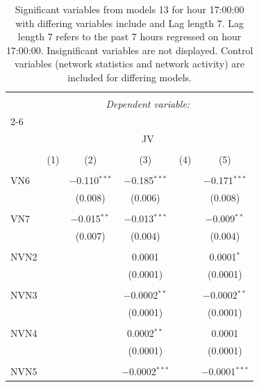 
\begin{table}[!htbp] \centering 
  \caption{Significant variables from models 13 for hour 17:00:00 with differing variables include 
                               and Lag length 7. Lag length 7 refers to the past 7 hours regressed on hour 17:00:00. 
                               Insignificant variables are not displayed. 
                               Control variables (network statistics and network activity) are 
                               included for differing models.} 
  \label{Jmodels1_t_hourlagged4} 
\scriptsize 
\begin{tabular}{@{\extracolsep{5pt}}lccccc} 
\\[-1.8ex]\hline 
\hline \\[-1.8ex] 
 & \multicolumn{5}{c}{\textit{Dependent variable:}} \\ 
\cline{2-6} 
\\[-1.8ex] & \multicolumn{5}{c}{JV} \\ 
\\[-1.8ex] & (1) & (2) & (3) & (4) & (5)\\ 
\hline \\[-1.8ex] 
 VN6 &  & $-$0.110$^{***}$ & $-$0.185$^{***}$ &  & $-$0.171$^{***}$ \\ 
  &  & (0.008) & (0.006) &  & (0.008) \\ 
  & & & & & \\ 
 VN7 &  & $-$0.015$^{**}$ & $-$0.013$^{***}$ &  & $-$0.009$^{**}$ \\ 
  &  & (0.007) & (0.004) &  & (0.004) \\ 
  & & & & & \\ 
 NVN2 &  &  & 0.0001 &  & 0.0001$^{*}$ \\ 
  &  &  & (0.0001) &  & (0.0001) \\ 
  & & & & & \\ 
 NVN3 &  &  & $-$0.0002$^{**}$ &  & $-$0.0002$^{**}$ \\ 
  &  &  & (0.0001) &  & (0.0001) \\ 
  & & & & & \\ 
 NVN4 &  &  & 0.0002$^{**}$ &  & 0.0001 \\ 
  &  &  & (0.0001) &  & (0.0001) \\ 
  & & & & & \\ 
 NVN5 &  &  & $-$0.0002$^{***}$ &  & $-$0.0001$^{***}$ \\ 

\end{tabular}
\end{table}

